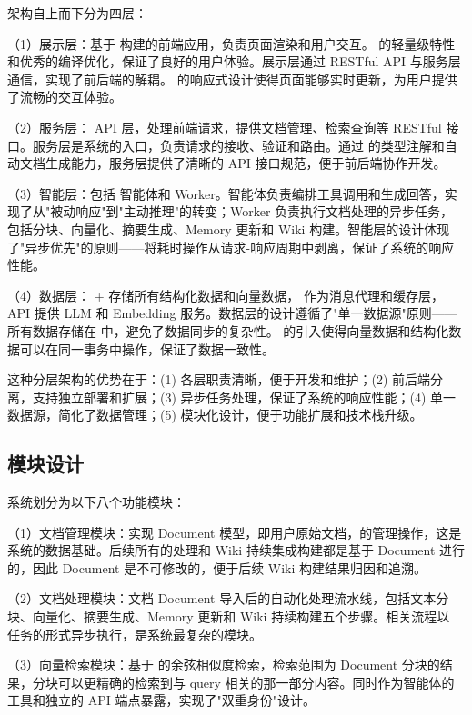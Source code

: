 架构自上而下分为四层：

（1）展示层：基于  构建的前端应用，负责页面渲染和用户交互。 的轻量级特性和优秀的编译优化，保证了良好的用户体验。展示层通过 RESTful API 与服务层通信，实现了前后端的解耦。 的响应式设计使得页面能够实时更新，为用户提供了流畅的交互体验。

（2）服务层： API 层，处理前端请求，提供文档管理、检索查询等 RESTful 接口。服务层是系统的入口，负责请求的接收、验证和路由。通过  的类型注解和自动文档生成能力，服务层提供了清晰的 API 接口规范，便于前后端协作开发。

（3）智能层：包括  智能体和  Worker。智能体负责编排工具调用和生成回答，实现了从"被动响应"到"主动推理"的转变；Worker 负责执行文档处理的异步任务，包括分块、向量化、摘要生成、Memory 更新和 Wiki 构建。智能层的设计体现了"异步优先"的原则——将耗时操作从请求-响应周期中剥离，保证了系统的响应性能。

（4）数据层： +  存储所有结构化数据和向量数据， 作为消息代理和缓存层， API 提供 LLM 和 Embedding 服务。数据层的设计遵循了"单一数据源"原则——所有数据存储在  中，避免了数据同步的复杂性。 的引入使得向量数据和结构化数据可以在同一事务中操作，保证了数据一致性。

这种分层架构的优势在于：(1) 各层职责清晰，便于开发和维护；(2) 前后端分离，支持独立部署和扩展；(3) 异步任务处理，保证了系统的响应性能；(4) 单一数据源，简化了数据管理；(5) 模块化设计，便于功能扩展和技术栈升级。

\subsection{模块设计}

系统划分为以下八个功能模块：

（1）文档管理模块：实现 Document 模型，即用户原始文档，的管理操作，这是系统的数据基础。后续所有的处理和 Wiki 持续集成构建都是基于 Document 进行的，因此 Document 是不可修改的，便于后续 Wiki 构建结果归因和追溯。

（2）文档处理模块：文档 Document 导入后的自动化处理流水线，包括文本分块、向量化、摘要生成、Memory 更新和 Wiki 持续构建五个步骤。相关流程以  任务的形式异步执行，是系统最复杂的模块。

（3）向量检索模块：基于  的余弦相似度检索，检索范围为 Document 分块的结果，分块可以更精确的检索到与 query 相关的那一部分内容。同时作为智能体的工具和独立的 API 端点暴露，实现了"双重身份"设计。

